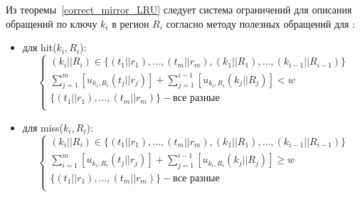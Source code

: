\begin{enumerate}
Из теоремы~\ref{correct_mirror_LRU} следует система ограничений для
описания обращений по ключу $k_i$ в регион $R_i$ согласно методу полезных обращений для \LRU: \begin{itemize}
\item для hit($k_i, R_i$):
$$
\left\{\begin{array}{l} (k_i||R_i) \in \{(t_1||r_1), ..., (t_m||r_m), (k_1||R_1),
..., (k_{i-1}||R_{i-1})\}\\
\sum\limits_{j=1}^m [u_{k_i,R_i}(t_j||r_j)] + \sum\limits_{j=1}^{i-1} [u_{k_i,R_i}(k_j||R_j)] < w\\
\{(t_1||r_1), ..., (t_m||r_m)\} - \mbox{все разные}\\
\end{array} \right.
$$
\item для miss($k_i, R_i$):
$$
\left\{\begin{array}{l} (k_i||R_i) \in \{(t_1||r_1), ..., (t_m||r_m), (k_1||R_1),
..., (k_{i-1}||R_{i-1})\}\\
\sum\limits_{i=1}^m [u_{k_i,R_i}(t_j||r_j)] + \sum\limits_{j=1}^{i-1} [u_{k_i,R_i}(k_j||R_j)]
\geqslant w\\
\{(t_1||r_1), ..., (t_m||r_m)\} - \mbox{все разные}\\
\end{array} \right.
$$
\end{itemize}


%
%
%
%


\end{enumerate}
